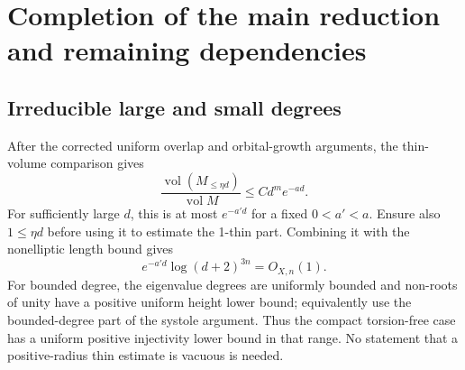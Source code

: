 \documentclass[10pt]{article}
\begin{document}
\section*{Completion of the main reduction and remaining dependencies}
\subsection*{Irreducible large and small degrees}
After the corrected uniform overlap and orbital-growth arguments, the thin-volume comparison gives \[\frac{\operatorname{vol}(M_{\le\eta d})}{\operatorname{vol}M}\le C d^m e^{-ad}.\] For sufficiently large \(d\), this is at most \(e^{-a'd}\) for a fixed \(0<a'<a\). Ensure also \(1\le\eta d\) before using it to estimate the 1-thin part. Combining it with the nonelliptic length bound gives \[e^{-a'd}\log(d+2)^{3n}=O_{X,n}(1).\] For bounded degree, the eigenvalue degrees are uniformly bounded and non-roots of unity have a positive uniform height lower bound; equivalently use the bounded-degree part of the systole argument. Thus the compact torsion-free case has a uniform positive injectivity lower bound in that range. No statement that a positive-radius thin estimate is vacuous is needed.\par
\end{document}

